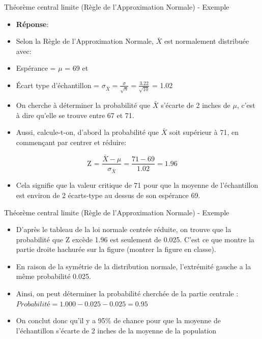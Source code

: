 \documentclass[
  ignorenonframetext,
]{beamer}
\providecommand{\tightlist}{%
  \setlength{\itemsep}{0pt}\setlength{\parskip}{0pt}}
\begin{document}
\begin{frame}{Théorème central limite (Règle de l'Approximation Normale)
- Exemple}
\protect\hypertarget{thuxe9oruxe8me-central-limite-ruxe8gle-de-lapproximation-normale---exemple}{}
\begin{itemize}
\item
  \textbf{Réponse}:
\item
  Selon la Règle de l'Approximation Normale, \(\bar{X}\) est normalement
  distribuée avec:
\item
  Espérance = \(\mu\) = 69 et
\item
  Écart type d'échantillon =
  \(\sigma_{\bar{X}} = \frac{\sigma}{\sqrt{n}} = \frac{3.22}{\sqrt{10}}\)
  = 1.02
\item
  On cherche à déterminer la probabilité que \(\bar{X}\) s'écarte de 2
  inches de \(\mu\), c'est à dire qu'elle se trouve entre 67 et 71.
\item
  Aussi, calcule-t-on, d'abord la probabilité que \(\bar{X}\) soit
  supérieur à 71, en commençant par centrer et réduire:
\end{itemize}

\[\text{Z = } \frac{\bar{X}-\mu}{\sigma_{\bar{X}}} = \frac{71 - 69}{1.02} = 1.96\]

\begin{itemize}
\tightlist
\item
  Cela signifie que la valeur critique de 71 pour que la moyenne de
  l'échantillon est environ de 2 écarts-type au dessus de son espérance
  69.
\end{itemize}
\end{frame}

\begin{frame}{Théorème central limite (Règle de l'Approximation Normale)
- Exemple}
\protect\hypertarget{thuxe9oruxe8me-central-limite-ruxe8gle-de-lapproximation-normale---exemple-1}{}
\begin{itemize}
\tightlist
\item
  D'après le tableau de la loi normale centrée réduite, on trouve que la
  probabilité que Z excède 1.96 est seulement de 0.025. C'est ce que
  montre la partie droite hachurée sur la figure (montrer la figure en
  classe).
\item
  En raison de la symétrie de la distribution normale, l'extrémité
  gauche a la même probabilité 0.025.
\item
  Ainsi, on peut déterminer la probabilité cherchée de la partie
  centrale : \(Probabilité = 1.000 - 0.025 - 0.025 = 0.95\)
\item
  On conclut donc qu'il y a 95\% de chance pour que la moyenne de
  l'échantillon s'écarte de 2 inches de la moyenne de la population
\end{itemize}
\end{frame}
\end{document}

